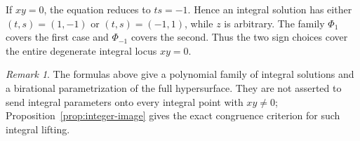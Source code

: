 \documentclass[11pt]{article}
\theoremstyle{remark}
\newtheorem{remark}[theorem]{Remark}
\begin{document}
If \(xy=0\), the equation reduces to \(ts=-1\).  Hence an integral solution
has either \((t,s)=(1,-1)\) or \((t,s)=(-1,1)\), while \(z\) is arbitrary.
The family \(\Phi_1\) covers the first case and \(\Phi_{-1}\) covers the
second.  Thus the two sign choices cover the entire degenerate integral locus
\(xy=0\).

\begin{remark}
The formulas above give a polynomial family of integral solutions and a
birational parametrization of the full hypersurface.  They are not asserted
to send integral parameters onto every integral point with \(xy\neq0\);
Proposition~\ref{prop:integer-image} gives the exact congruence criterion for
such integral lifting.
\end{remark}
\end{document}
